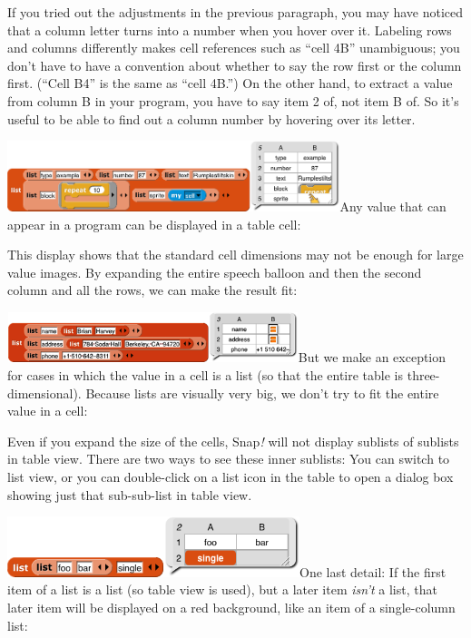 If you tried out the adjustments in the previous paragraph, you may have
noticed that a column letter turns into a number when you hover over it.
Labeling rows and columns differently makes cell references such as
``cell 4B'' unambiguous; you don't have to have a convention about
whether to say the row first or the column first. (``Cell B4'' is the
same as ``cell 4B.'') On the other hand, to extract a value from column
B in your program, you have to say item 2 of, not item B of. So it's
useful to be able to find out a column number by hovering over its
letter.

\includegraphics[width=3.81736in,height=0.81111in]{media/image596.png}Any
value that can appear in a program can be displayed in a table cell:

This display shows that the standard cell dimensions may not be enough
for large value images. By expanding the entire speech balloon and then
the second column and all the rows, we can make the result fit:

\includegraphics[width=3.34097in,height=0.57708in]{media/image601.png}But
we make an exception for cases in which the value in a cell is a list
(so that the entire table is three-dimensional). Because lists are
visually very big, we don't try to fit the entire value in a cell:

Even if you expand the size of the cells, Snap\emph{!} will not display
sublists of sublists in table view. There are two ways to see these
inner sublists: You can switch to list view, or you can double-click on
a list icon in the table to open a dialog box showing just that
sub-sub-list in table view.

\includegraphics[width=3.35417in,height=0.69444in]{media/image602.png}One
last detail: If the first item of a list is a list (so table view is
used), but a later item \emph{isn't} a list, that later item will be
displayed on a red background, like an item of a single-column list:

